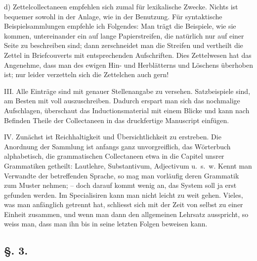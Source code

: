 d) Zettelcollectaneen empfehlen sich zumal für lexikalische Zwecke. Nichts ist bequemer sowohl in der Anlage, wie in der Benutzung. Für syntaktische Beispielsammlungen empfehle ich Folgendes: Man trägt die Beispiele, wie sie kommen, untereinander ein auf lange Papierstreifen, die natürlich nur auf einer Seite zu beschreiben sind; dann zerschneidet man die Streifen und vertheilt die Zettel in Briefcouverts mit entsprechenden Aufschriften. Dies Zettelwesen hat das Angenehme, dass man des ewigen Hin- und Herblätterns und Löschens überhoben ist; nur leider verzetteln sich die Zettelchen auch gern!

III. Alle Einträge sind mit genauer Stellenangabe zu versehen. Satzbeispiele sind, am Besten mit  voll auszuschreiben. Dadurch erspart man sich das nochmalige Aufschlagen, überschaut das Inductionsmaterial mit einem Blicke und kann nach Befinden Theile der Collectaneen in das druckfertige Manuscript einfügen.

IV. Zunächst ist Reichhaltigkeit und Übersichtlichkeit zu erstreben. \label{fp.81} Die Anordnung der Sammlung ist anfangs ganz unvorgreiflich, das Wörterbuch alphabetisch, die grammatischen Collectaneen etwa in die Capitel unsrer Grammatiken getheilt: Lautlehre, Substantivum, Adjectivum u.~s.~w. Kennt man Verwandte der betreffenden Sprache, so mag man vorläufig deren Grammatik zum Muster nehmen; – doch darauf kommt wenig an, das System soll ja erst gefunden werden. Im Specialisiren kann man nicht leicht zu weit gehen. Vieles, was man anfänglich getrennt hat, schliesst sich mit der Zeit von selbst zu einer Einheit zusammen, und wenn man dann den allgemeinen Lehrsatz ausspricht, so weiss man, dass man ihn bis in seine letzten Folgen beweisen kann.

\subsection*{§. 3.}\label{II.V.3}
